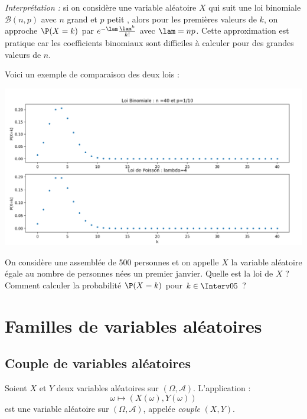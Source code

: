 \documentclass[a4paper,10pt]{report}
\begin{document}
\noindent \textit{Interprétation :} si on considère une variable aléatoire $X$ qui suit une loi binomiale $\mathcal B(n,p)$ avec $n$ \og grand \fg et $p$ \og petit \fg, alors pour les premières valeurs de $k$, on approche $\P(X=k)$ par $e^{-\lam} \frac{\lam^k}{k !}$ avec $\lam = np$. Cette approximation est pratique car les coefficients binomiaux sont difficiles à calculer pour des grandes valeurs de $n$.

\medskip

\begin{preuve}
\vspace{6cm}
\end{preuve}

\newpage
\noindent Voici un exemple de comparaison des deux lois :


\begin{center}
\includegraphics[scale=0.4]{Poisson}
\end{center}

\begin{ex}
On considère une assemblée de 500 personnes et on appelle $X$ la variable aléatoire égale au nombre de personnes nées un premier janvier. Quelle est la loi de $X$ ? Comment calculer la probabilité $\P(X=k)$ pour $k\in \Interv 0 5$ ?

\vspace{4cm}
\end{ex}

\section{Familles de variables aléatoires}
\subsection{Couple de variables aléatoires}

\begin{defip} Soient $X$ et $Y$ deux variables aléatoires sur $(\Omega, \mathcal{A})$. L'application :
$$ \omega \mapsto (X(\omega), Y(\omega))$$
est une variable aléatoire sur $(\Omega, \mathcal{A})$, appelée \textit{couple} $(X,Y)$.
\end{defip}
\end{document}
